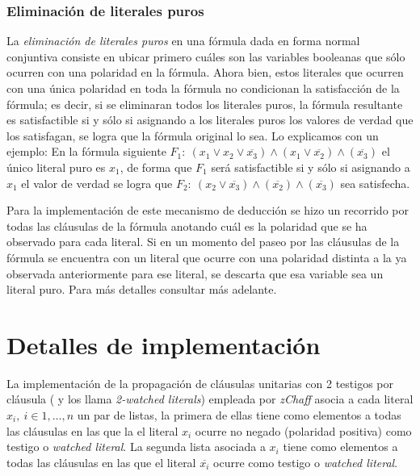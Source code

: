 \documentclass[12pt,lettersize]{article}
\begin{document}
\subsubsection{Eliminación de literales puros}

La \emph{eliminación de literales puros} en una fórmula dada en forma normal
conjuntiva consiste en ubicar primero cuáles son las variables booleanas que
sólo ocurren con una polaridad en la fórmula. Ahora bien, estos literales que
ocurren con una única polaridad en toda la fórmula no condicionan la
satisfacción de la fórmula; es decir, si se eliminaran todos los literales
puros, la fórmula resultante es satisfactible si y sólo si asignando a los
literales puros los valores de verdad que los satisfagan, se logra que la
fórmula original lo sea. Lo explicamos con un ejemplo: En la fórmula siguiente
$F_1:\ (x_1 \vee x_2 \vee \overline{x_3}) \wedge (x_1 \vee \overline{x_2})
\wedge (\overline{x_3})$ el único literal puro es $x_1$, de forma que $F_1$ será
satisfactible si y sólo si asignando a $x_1$ el valor de verdad se logra que
$F_2:\ (x_2 \vee \overline{x_3}) \wedge (\overline{x_2}) \wedge
(\overline{x_3})$ sea satisfecha.

Para la implementación de este mecanismo de deducción se hizo un recorrido por
todas las cláusulas de la fórmula anotando cuál es la polaridad que se ha
observado para cada literal. Si en un momento del paseo por las cláusulas de la
fórmula se encuentra con un literal que ocurre con una polaridad distinta a la
ya observada anteriormente para ese literal, se descarta que esa variable sea un
literal puro. Para más detalles consultar más adelante.

\section{Detalles de implementación}


La implementación de la propagación de cláusulas unitarias con 2 testigos por
cláusula (\cite{Zhang} y \cite{ZhangThesis} los llama \emph{2-watched literals})
empleada por \emph{zChaff} asocia a cada literal $x_i,\ i\in{1,\ldots,n}$ un par
de listas, la primera de ellas tiene como elementos a todas las cláusulas en las
que la el literal $x_i$ ocurre no negado (polaridad positiva) como testigo o
\emph{watched literal}. La segunda lista asociada a $x_i$ tiene como elementos a
todas las cláusulas en las que el literal $\overline{x_i}$ ocurre como testigo o
\emph{watched literal}.
\end{document}
